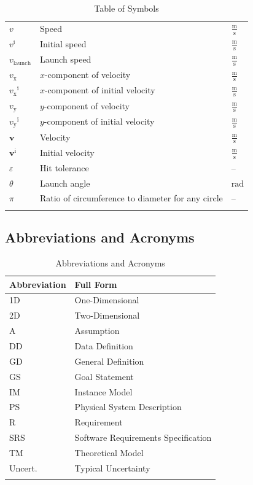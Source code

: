 \documentclass[12pt]{article}
\begin{document}
\begin{longtabu}{l X[l] l}
$v$ & Speed & $\frac{\text{m}}{\text{s}}$
\\
${v^{\text{i}}}$ & Initial speed & $\frac{\text{m}}{\text{s}}$
\\
${v_{\text{launch}}}$ & Launch speed & $\frac{\text{m}}{\text{s}}$
\\
${v_{\text{x}}}$ & $x$-component of velocity & $\frac{\text{m}}{\text{s}}$
\\
${{v_{\text{x}}}^{\text{i}}}$ & $x$-component of initial velocity & $\frac{\text{m}}{\text{s}}$
\\
${v_{\text{y}}}$ & $y$-component of velocity & $\frac{\text{m}}{\text{s}}$
\\
${{v_{\text{y}}}^{\text{i}}}$ & $y$-component of initial velocity & $\frac{\text{m}}{\text{s}}$
\\
$\mathbf{v}$ & Velocity & $\frac{\text{m}}{\text{s}}$
\\
${\mathbf{v}^{\text{i}}}$ & Initial velocity & $\frac{\text{m}}{\text{s}}$
\\
$ε$ & Hit tolerance & --
\\
$θ$ & Launch angle & ${\text{rad}}$
\\
$π$ & Ratio of circumference to diameter for any circle & --
\\
\bottomrule
\caption{Table of Symbols}
\label{Table:ToS}
\end{longtabu}
\subsection{Abbreviations and Acronyms}
\label{Sec:TAbbAcc}
\begin{longtable}{l l}
\toprule
\textbf{Abbreviation} & \textbf{Full Form}
\\
\midrule
\endhead
1D & One-Dimensional
\\
2D & Two-Dimensional
\\
A & Assumption
\\
DD & Data Definition
\\
GD & General Definition
\\
GS & Goal Statement
\\
IM & Instance Model
\\
PS & Physical System Description
\\
R & Requirement
\\
SRS & Software Requirements Specification
\\
TM & Theoretical Model
\\
Uncert. & Typical Uncertainty
\\
\bottomrule
\caption{Abbreviations and Acronyms}
\label{Table:TAbbAcc}
\end{longtable}
\end{document}
